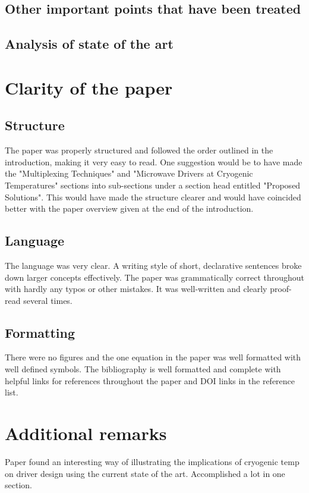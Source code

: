 \documentclass[11pt]{article}
\begin{document}
\subsection{Other important points that have been treated}
\label{sec:orge91069c}

\subsection{Analysis of state of the art}
\label{sec:orgc854c7b}

\section{Clarity of the paper}
\label{sec:orgfe10209}

\subsection{Structure}
\label{sec:orgfa07986}
The paper was properly structured and followed the order outlined in
the introduction, making it very easy to read. One suggestion would be
to have made the "Multiplexing Techniques" and "Microwave Drivers at
Cryogenic Temperatures" sections into sub-sections under a section
head entitled "Proposed Solutions". This would have made the structure
clearer and would have coincided better with the paper overview given
at the end of the introduction.

\subsection{Language}
\label{sec:org8830220}
The language was very clear. A writing style of short, declarative
sentences broke down larger concepts effectively. The paper was
grammatically correct throughout with hardly any typos or other
mistakes. It was well-written and clearly proof-read several times.

\subsection{Formatting}
\label{sec:orgab69eba}
There were no figures and the one equation in the paper was
well formatted with well defined symbols. The bibliography is well
formatted and complete with helpful links for references throughout
the paper and DOI links in the reference list.

\section{Additional remarks}
\label{sec:org9dc93cc}
Paper found an interesting way of illustrating the implications of
cryogenic temp on driver design using the current state of the art.
Accomplished a lot in one section.
\end{document}

